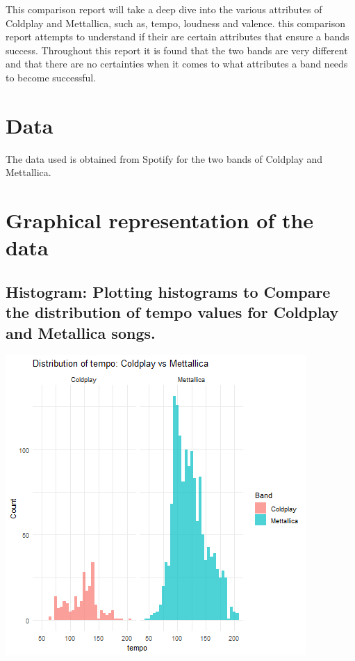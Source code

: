 \documentclass[11pt,preprint, authoryear]{elsarticle}
\let\origfigure\figure
\let\endorigfigure\endfigure
\renewenvironment{figure}[1][2] {
    \expandafter\origfigure\expandafter[H]
} {
    \endorigfigure
}
\numberwithin{equation}{section}
\numberwithin{figure}{section}
\numberwithin{table}{section}
\begin{document}
This comparison report will take a deep dive into the various attributes
of Coldplay and Mettallica, such as, tempo, loudness and valence. this
comparison report attempts to understand if their are certain attributes
that ensure a bands success. Throughout this report it is found that the
two bands are very different and that there are no certainties when it
comes to what attributes a band needs to become successful.

\hypertarget{data}{%
\section{Data}\label{data}}

The data used is obtained from Spotify for the two bands of Coldplay and
Mettallica.

\hypertarget{graphical-representation-of-the-data}{%
\section{Graphical representation of the
data}\label{graphical-representation-of-the-data}}

\hypertarget{histogram-plotting-histograms-to-compare-the-distribution-of-tempo-values-for-coldplay-and-metallica-songs.}{%
\subsection{Histogram: Plotting histograms to Compare the distribution
of tempo values for Coldplay and Metallica
songs.}\label{histogram-plotting-histograms-to-compare-the-distribution-of-tempo-values-for-coldplay-and-metallica-songs.}}

\begin{figure}[H]

{\centering \includegraphics{Question-3_files/figure-latex/Figure 1-1} 

}

\caption{Tempo distribution \label{Figure1}}\label{fig:Figure 1}
\end{figure}
\end{document}
